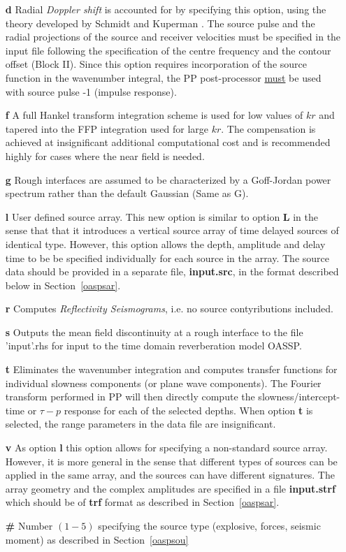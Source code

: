 \begin{itemize}
\item[{\bf d}] Radial {\em Doppler shift} is accounted for by
specifying  this option, using the theory developed by Schmidt and Kuperman
\cite{sk:jasa94}.  The source pulse and the radial projections of the
source and  receiver velocities must be specified in the input file
following the specification of the centre frequency and the contour
offset (Block II). Since this option requires incorporation of the
source function in the wavenumber integral, the PP post-processor
\underline{must} be used with source pulse -1 (impulse response).
    \item[{\bf f}] A full Hankel transform integration scheme is used
for low values of $ kr $ and tapered into the FFP integration used for
large $ kr $. The compensation is achieved at insignificant
additional computational cost and is recommended highly for cases
where the near field is  needed.    
          \item[{\bf g}] Rough interfaces 
          are assumed to be characterized by a Goff-Jordan power
          spectrum rather than the default Gaussian (Same as G).
          \item[{\bf l}] User defined source array. This new option is
          similar to option {\bf L} in the sense that that it
          introduces a vertical source array of time delayed sources
          of identical type. However, this option allows the depth,
          amplitude and delay time to be be specified individually for
          each source in the array. The source data should be provided
          in a separate file, {\bf input.src}, in the format described
          below in Section~\ref{oaspsar}.  
\item[{\bf r}] Computes {\em Reflectivity Seismograms}, i.e. no source contyributions included.
\item[{\bf s}] Outputs the
          mean field discontinuity at a rough interface to the file
          'input'.rhs for input to the time domain reverberation model
          OASSP.  
\item[{\bf t}] Eliminates the wavenumber integration
          and computes transfer functions for individual slowness
          components (or plane wave components). The Fourier transform
          performed in PP will then directly compute the
          slowness/intercept-time or $\tau - p$ response for each of
          the selected depths. When option {\bf t} is selected, the
          range parameters in the data file are insignificant.
\item[{\bf v}] As option {\bf l} this option allows for
          specifying a non-standard source array. However, it is more
          general in the sense that different types of sources can be
          applied in the same array, and the sources can have
          different signatures. The array geometry and the complex
          amplitudes are specified in a file {\bf input.strf} which
          should be of {\bf trf} format as described in
          Section~\ref{oaspsar}. 
 \item[{\bf \#}] Number $(1-5)$
          specifying the source type (explosive, forces, seismic
          moment) as described in Section~\ref{oaspsou}
\end{itemize}


